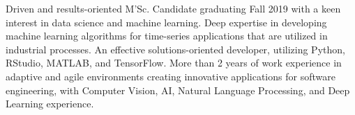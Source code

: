 

\begin{cvparagraph}

Driven and results-oriented M'Sc. Candidate graduating Fall 2019 with a keen interest in data science and machine learning. Deep expertise in developing machine learning algorithms for time-series applications that are utilized in industrial processes. An effective solutions-oriented developer, utilizing Python, RStudio, MATLAB, and TensorFlow. More than 2 years of work experience in adaptive and agile environments creating innovative applications for software engineering, with Computer Vision, AI, Natural Language Processing, and Deep Learning experience.
\end{cvparagraph}

